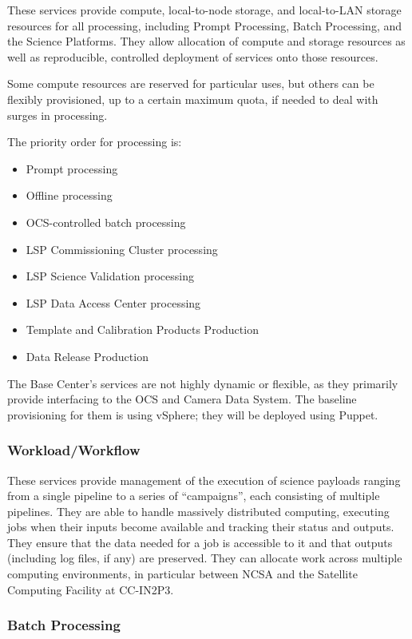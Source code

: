 \documentclass[DM,toc]{lsstdoc}
\begin{document}
These services provide compute, local-to-node storage, and local-to-LAN
storage resources for all processing, including Prompt Processing, Batch
Processing, and the Science Platforms. They allow allocation of compute
and storage resources as well as reproducible, controlled deployment of
services onto those resources.

Some compute resources are reserved for particular uses, but others can
be flexibly provisioned, up to a certain maximum quota, if needed to
deal with surges in processing.

The priority order for processing is:
\begin{itemize}
\item
  Prompt processing
\item
  Offline processing
\item
  OCS-controlled batch processing
\item
  LSP Commissioning Cluster processing
\item
  LSP Science Validation processing
\item
  LSP Data Access Center processing
\item
  Template and Calibration Products Production
\item
  Data Release Production
\end{itemize}

The Base Center's services are not highly dynamic or flexible, as they
primarily provide interfacing to the OCS and Camera Data System. The
baseline provisioning for them is using vSphere; they will be deployed
using Puppet.

\subsubsection{Workload/Workflow}\label{workloadworkflow}

These services provide management of the execution of science payloads
ranging from a single pipeline to a series of ``campaigns'', each
consisting of multiple pipelines. They are able to handle massively
distributed computing, executing jobs when their inputs become available
and tracking their status and outputs. They ensure that the data needed
for a job is accessible to it and that outputs (including log files, if
any) are preserved. They can allocate work across multiple computing
environments, in particular between NCSA and the Satellite Computing
Facility at CC-IN2P3.

\subsubsection{Batch Processing}\label{batch-processing}
\end{document}
